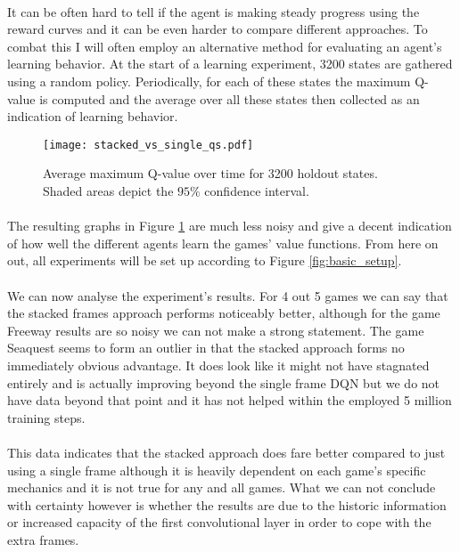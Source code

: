 \paragraph{}
It can be often hard to tell if the agent is making steady progress
using the reward curves
and it can be even harder to compare different approaches.
To combat this I will often employ an alternative method
for evaluating an agent's learning behavior.
At the start of a learning experiment, 3200 states are gathered
using a random policy.
Periodically,
for each of these states the maximum Q-value is computed
and the average over all these states then collected
as an indication of learning behavior.

\begin{figure}[htpb]
  \centering
  \texttt{[image: stacked\_vs\_single\_qs.pdf]}
  \caption[DQN Q-values over time]{
    Average maximum Q-value over time for 3200 holdout states.
    Shaded areas depict the $95\%$ confidence interval.
  }
  \label{fig:stacked_vs_single_qs}
\end{figure}

\paragraph{}
The resulting graphs in Figure \ref{fig:stacked_vs_single_qs}
are much less noisy
and give a decent indication of how well the
different agents learn the games' value functions.
From here on out,
all experiments will be set up according to
Figure \ref{fig:basic_setup}.

\paragraph{}
We can now analyse the experiment's results.
For 4 out 5 games we can say that the stacked frames approach
performs noticeably better,
although for the game Freeway results are so noisy
we can not make a strong statement.
The game Seaquest seems to form an outlier
in that the stacked approach forms no immediately obvious advantage.
It does look like it might not have stagnated entirely
and is actually improving beyond the single frame DQN
but we do not have data beyond that point
and it has not helped within the employed 5 million training steps.

\paragraph{}
This data indicates that the stacked approach does
fare better compared to just using a single frame
although it is heavily dependent on each game's specific mechanics
and it is not true for any and all games.
What we can not conclude with certainty however
is whether the results are due to the historic information
or increased capacity of the first convolutional layer
in order to cope with the extra frames.


